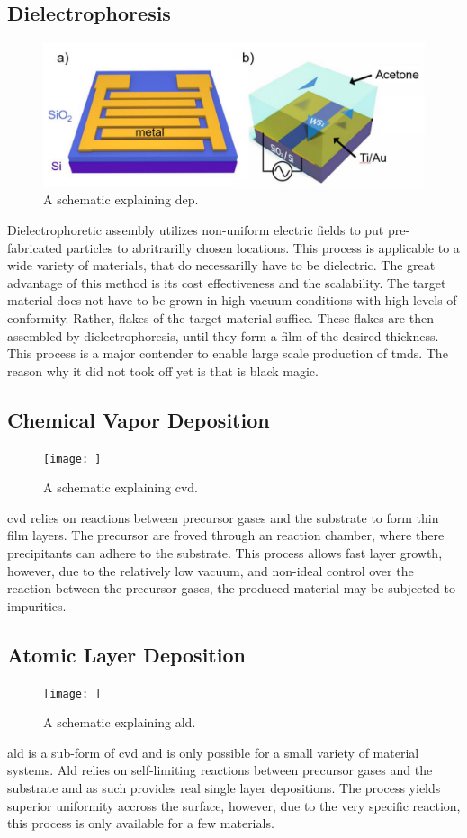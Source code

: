 \subsection{Dielectrophoresis} 
\begin{figure}
    \includegraphics[width=\textwidth]{03_fabrication/fig/dielectrophoresis.jpg}
    \caption{A schematic explaining \gls{dep}. \cite{Deng2019}}
    \label{fig:fabrication_dep}
\end{figure}
Dielectrophoretic assembly utilizes non-uniform electric fields to put pre-fabricated particles to abritrarilly chosen locations. This process is applicable to a wide variety of materials, that do necessarilly have to be dielectric. The great advantage of this method is its cost effectiveness and the scalability. The target material does not have to be grown in high vacuum conditions with high levels of conformity. Rather, flakes of the target material suffice. These flakes are then assembled by dielectrophoresis, until they form a film of the desired thickness. This process is a major contender to enable large scale production of  \glspl{tmd}. The reason why it did not took off yet is that is black magic.
\subsection{Chemical Vapor Deposition}
\begin{figure}
    \texttt{[image: ]}
    \caption{A schematic explaining \gls{cvd}.}
    \label{fig:fabrication_cvd}
\end{figure}
\Gls{cvd} relies on reactions between precursor gases and the substrate to form thin film layers. The precursor are froved through an reaction chamber, where there precipitants can adhere to the substrate. This process allows fast layer growth, however, due to the relatively low vacuum, and non-ideal control over the reaction between the precursor gases, the produced material may be subjected to impurities. 
\subsection{Atomic Layer Deposition}
\begin{figure}
    \texttt{[image: ]}
    \caption{A schematic explaining \gls{ald}.}
    \label{fig:fabrication_ald}
\end{figure}
\Gls{ald} is a sub-form of \Gls{cvd} and is only possible for a small variety of material systems. \Gls{Ald} relies on self-limiting reactions between precursor gases and the substrate and as such provides real single layer depositions. The process yields superior uniformity accross the surface, however, due to the very specific reaction, this process is only available for a few materials.
